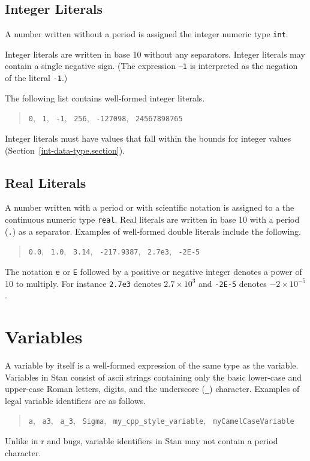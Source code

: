 \documentclass[10pt]{report}
\newcommand{\Stan}{Stan\xspace}
\newcommand{\acronym}[1]{{\sc #1}\xspace}
\newcommand{\ASCII}{\acronym{ascii}}
\newcommand{\R}{\acronym{r}}
\newcommand{\BUGS}{\acronym{bugs}}
\newcommand{\code}[1]{{\tt #1}}
\newcommand{\refsection}[1]{Section~\ref{#1.section}}
\begin{document}
\subsection{Integer Literals}

A number written without a period is assigned the integer numeric type
\code{int}.

Integer literals are written in base 10 without any separators.
Integer literals may contain a single negative sign.  (The expression
\code{--1} is interpreted as the negation of the literal \code{-1}.)

The following list contains well-formed integer literals.
%
\begin{quote}
\code{0}, \ \code{1}, \ \code{-1}, \ \code{256}, 
\ \code{-127098}, \ \code{24567898765}
\end{quote}
%
Integer literals must have values that fall within the bounds for
integer values (\refsection{int-data-type}).

\subsection{Real Literals}

A number written with a period or with scientific notation is assigned
to a the continuous numeric type \code{real}.  Real literals are
written in base 10 with a period (\code{.}) as a separator.  Examples
of well-formed double literals include the following.
%
\begin{quote}
\code{0.0}, \ \code{1.0}, \ \code{3.14}, \ \code{-217.9387}, \ 
\code{2.7e3}, \ \code{-2E-5}
\end{quote}
%
The notation \code{e} or \code{E} followed by a positive or negative
integer denotes a power of 10 to multiply.  For instance \code{2.7e3}
denotes $2.7 \times 10^3$ and \code{-2E-5} denotes $-2 \times
10^{-5}$.


\section{Variables}

A variable by itself is a well-formed expression of the same type as
the variable.  Variables in \Stan consist of \ASCII strings containing
only the basic lower-case and upper-case Roman letters, digits, and
the underscore (\code{\_}) character.   Examples of legal variable
identifiers are as follows.
\begin{quote}
\code{a}, 
\ \code{a3}, 
\ \code{a\_3},
\ \code{Sigma}, 
\ \code{my\_cpp\_style\_variable},
\ \code{myCamelCaseVariable}
\end{quote}
%
Unlike in \R and \BUGS, variable identifiers in \Stan may not contain
a period character.
\end{document}

